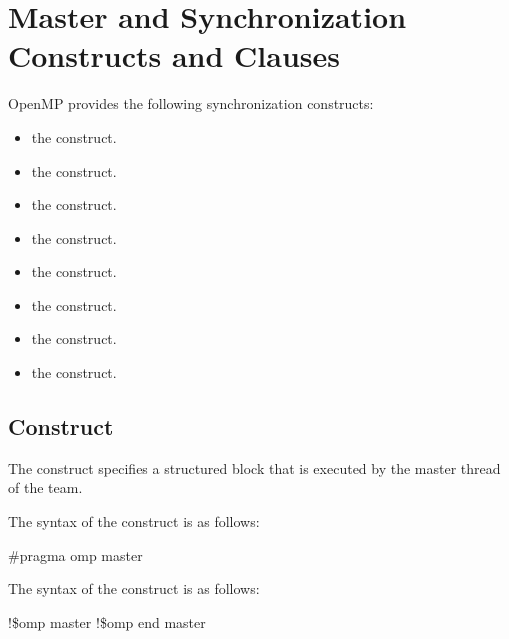\section{Master and Synchronization Constructs and Clauses}
\label{sec:Master and Synchronization Constructs and Clauses}
OpenMP provides the following synchronization constructs:
\begin{itemize}
\item the  construct.

\item the  construct.

\item the  construct.

\item the  construct.

\item the  construct.

\item the  construct.

\item the  construct.

\item the  construct.
\end{itemize}










\subsection{ Construct}
\label{subsec:master Construct}
\summary
The  construct specifies a structured block that is executed by the master thread 
of the team.

\syntax
\ccppspecificstart
The syntax of the  construct is as follows:

\begin{boxedcode}
\#pragma omp master 
\end{boxedcode}
\ccppspecificend

\fortranspecificstart
The syntax of the  construct is as follows:

\begin{boxedcode}
!\$omp master
!\$omp end master
\end{boxedcode}
\fortranspecificend

